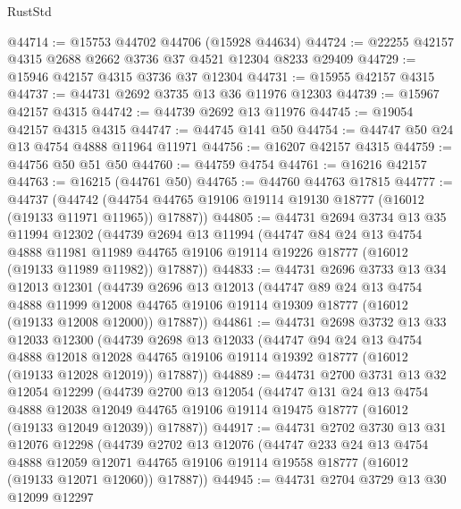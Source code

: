 \begin{lexlean}{RustStd}
\begin{coremodule}
@44714 := @15753 @44702 @44706 (@15928 @44634)
@44724 := @22255 @42157 @4315 @2688 @2662 @3736 @37 @4521 @12304 @8233 @29409
@44729 := @15946 @42157 @4315 @3736 @37 @12304
@44731 := @15955 @42157 @4315
@44737 := @44731 @2692 @3735 @13 @36 @11976 @12303
@44739 := @15967 @42157 @4315
@44742 := @44739 @2692 @13 @11976
@44745 := @19054 @42157 @4315 @4315
@44747 := @44745 @141 @50
@44754 := @44747 @50 @24 @13 @4754 @4888 @11964 @11971
@44756 := @16207 @42157 @4315
@44759 := @44756 @50 @51 @50
@44760 := @44759 @4754
@44761 := @16216 @42157
@44763 := @16215 (@44761 @50)
@44765 := @44760 @44763 @17815
@44777 := @44737
    (@44742 (@44754 @44765 @19106 @19114 @19130 @18777 (@16012 (@19133 @11971 @11965)) @17887))
@44805 := @44731
    @2694
    @3734
    @13
    @35
    @11994
    @12302
    (@44739
      @2694
      @13
      @11994
      (@44747
        @84
        @24
        @13
        @4754
        @4888
        @11981
        @11989
        @44765
        @19106
        @19114
        @19226
        @18777
        (@16012 (@19133 @11989 @11982))
        @17887))
@44833 := @44731
    @2696
    @3733
    @13
    @34
    @12013
    @12301
    (@44739
      @2696
      @13
      @12013
      (@44747
        @89
        @24
        @13
        @4754
        @4888
        @11999
        @12008
        @44765
        @19106
        @19114
        @19309
        @18777
        (@16012 (@19133 @12008 @12000))
        @17887))
@44861 := @44731
    @2698
    @3732
    @13
    @33
    @12033
    @12300
    (@44739
      @2698
      @13
      @12033
      (@44747
        @94
        @24
        @13
        @4754
        @4888
        @12018
        @12028
        @44765
        @19106
        @19114
        @19392
        @18777
        (@16012 (@19133 @12028 @12019))
        @17887))
@44889 := @44731
    @2700
    @3731
    @13
    @32
    @12054
    @12299
    (@44739
      @2700
      @13
      @12054
      (@44747
        @131
        @24
        @13
        @4754
        @4888
        @12038
        @12049
        @44765
        @19106
        @19114
        @19475
        @18777
        (@16012 (@19133 @12049 @12039))
        @17887))
@44917 := @44731
    @2702
    @3730
    @13
    @31
    @12076
    @12298
    (@44739
      @2702
      @13
      @12076
      (@44747
        @233
        @24
        @13
        @4754
        @4888
        @12059
        @12071
        @44765
        @19106
        @19114
        @19558
        @18777
        (@16012 (@19133 @12071 @12060))
        @17887))
@44945 := @44731
    @2704
    @3729
    @13
    @30
    @12099
    @12297

\end{coremodule}
\end{lexlean}
